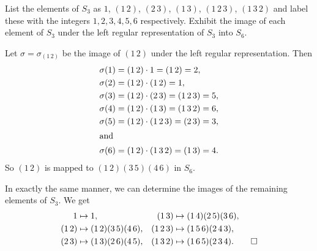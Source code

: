  List the elements of $S_3$ as $1$, $(1\,2)$, $(2\,3)$,
$(1\,3)$, $(1\,2\,3)$, $(1\,3\,2)$ and label these with the integers
$1,2,3,4,5,6$ respectively. Exhibit the image of each element of $S_3$
under the left regular representation of $S_3$ into $S_6$.
\begin{solution}
  Let $\sigma = \sigma_{(1\,2)}$ be the image of $(1\,2)$ under the
  left regular representation. Then
  \begin{align*}
    \sigma(1) &= (1\,2)\cdot1 = (1\,2) = 2, \\
    \sigma(2) &= (1\,2)\cdot(1\,2) = 1, \\
    \sigma(3) &= (1\,2)\cdot(2\,3) = (1\,2\,3) = 5, \\
    \sigma(4) &= (1\,2)\cdot(1\,3) = (1\,3\,2) = 6, \\
    \sigma(5) &= (1\,2)\cdot(1\,2\,3) = (2\,3) = 3, \\
    \intertext{and}
    \sigma(6) &= (1\,2)\cdot(1\,3\,2) = (1\,3) = 4.
  \end{align*}
  So $(1\,2)$ is mapped to $(1\,2)(3\,5)(4\,6)$ in $S_6$.

  In exactly the same manner, we can determine the images of the
  remaining elements of $S_3$. We get
  \begin{align*}
    1 &\mapsto 1,
    & (1\,3) &\mapsto (1\,4)(2\,5)(3\,6), \\
    (1\,2) &\mapsto (1\,2)(3\,5)(4\,6),
    & (1\,2\,3) &\mapsto (1\,5\,6)(2\,4\,3), \\
    (2\,3) &\mapsto (1\,3)(2\,6)(4\,5),
    & (1\,3\,2) &\mapsto (1\,6\,5)(2\,3\,4). \qedhere
  \end{align*}
\end{solution}

